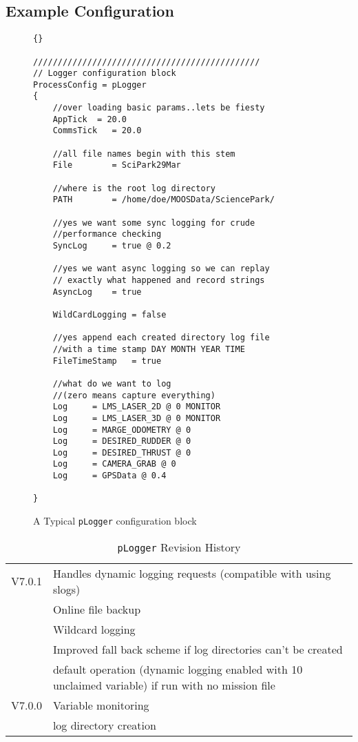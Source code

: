 \documentclass[a4paper,10pt]{article}
\newcommand{\Code}[1]{\texttt{#1} }
\newcommand{\code}[1]{\Code{#1} }
\begin{document}
\subsection{Example Configuration}
\begin{figure}[ht!]\label{fig:LoggerConfig}
\begin{lstlisting}[]{}

//////////////////////////////////////////////
// Logger configuration block
ProcessConfig = pLogger
{
    //over loading basic params..lets be fiesty
    AppTick  = 20.0
    CommsTick   = 20.0

    //all file names begin with this stem
    File        = SciPark29Mar

    //where is the root log directory
    PATH        = /home/doe/MOOSData/SciencePark/

    //yes we want some sync logging for crude
    //performance checking
    SyncLog     = true @ 0.2

    //yes we want async logging so we can replay
    // exactly what happened and record strings
    AsyncLog    = true

    WildCardLogging = false

    //yes append each created directory log file
    //with a time stamp DAY MONTH YEAR TIME
    FileTimeStamp   = true

    //what do we want to log
    //(zero means capture everything)
    Log     = LMS_LASER_2D @ 0 MONITOR
    Log     = LMS_LASER_3D @ 0 MONITOR
    Log     = MARGE_ODOMETRY @ 0
    Log     = DESIRED_RUDDER @ 0
    Log     = DESIRED_THRUST @ 0
    Log     = CAMERA_GRAB @ 0
    Log     = GPSData @ 0.4

}

\end{lstlisting}
\caption{A Typical \code{pLogger} configuration block}
\end{figure}


\begin{table}[ht!]
  \centering
  \caption{\code{pLogger} Revision History}\label{Tab:RevisionHistory}
  \begin{tabular}{|l|p{10cm}|}
    \hline
    V7.0.1 & Handles dynamic logging requests (compatible with using slogs)\\
     & Online file backup \\
     & Wildcard logging \\
     & Improved fall back scheme if log directories can't be created \\
     & default operation (dynamic logging enabled with 10 unclaimed variable) if run with no mission file\\
    V7.0.0 & Variable monitoring \\
     & log directory creation \\
    \hline
  \end{tabular}
\end{table}
\end{document}
